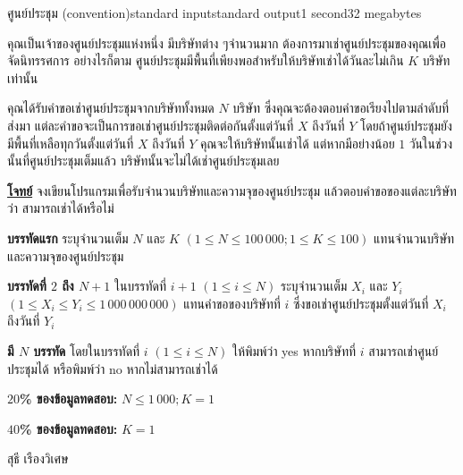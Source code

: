 \documentclass[11pt,a4paper]{article}
\begin{document}
\begin{problem}{ศูนย์ประชุม (convention)}{standard input}{standard output}{1 second}{32 megabytes}

คุณเป็นเจ้าของศูนย์ประชุมแห่งหนึ่ง มีบริษัทต่าง ๆจำนวนมาก ต้องการมาเช่าศูนย์ประชุมของคุณเพื่อจัดนิทรรศการ อย่างไรก็ตาม ศูนย์ประชุมมีพื้นที่เพียงพอสำหรับให้บริษัทเช่าได้วันละไม่เกิน $K$ บริษัทเท่านั้น

คุณได้รับคำขอเช่าศูนย์ประชุมจากบริษัททั้งหมด $N$ บริษัท ซึ่งคุณจะต้องตอบคำขอเรียงไปตามลำดับที่ส่งมา แต่ละคำขอจะเป็นการขอเช่าศูนย์ประชุมติดต่อกันตั้งแต่วันที่ $X$ ถึงวันที่ $Y$ โดยถ้าศูนย์ประชุมยังมีพื้นที่เหลือทุกวันตั้งแต่วันที่ $X$ ถึงวันที่ $Y$ คุณจะให้บริษัทนั้นเช่าได้ แต่หากมีอย่างน้อย $1$ วันในช่วงนั้นที่ศูนย์ประชุมเต็มแล้ว บริษัทนั้นจะไม่ได้เช่าศูนย์ประชุมเลย

\bigskip
\underline{\textbf{โจทย์}}  จงเขียนโปรแกรมเพื่อรับจำนวนบริษัทและความจุของศูนย์ประชุม แล้วตอบคำขอของแต่ละบริษัทว่า สามารถเช่าได้หรือไม่


\InputFile

\textbf{บรรทัดแรก} ระบุจำนวนเต็ม $N$ และ $K$ $(1 \leq N \leq 100\,000; 1 \leq K \leq 100)$ แทนจำนวนบริษัท และความจุของศูนย์ประชุม

\textbf{บรรทัดที่ $2$ ถึง $N+1$} ในบรรทัดที่ $i+1$ $(1 \leq i \leq N)$ ระบุจำนวนเต็ม $X_i$ และ $Y_i$ $(1 \leq X_i \leq Y_i \leq 1\,000\,000\,000)$ แทนคำขอของบริษัทที่ $i$ ซึ่งขอเช่าศูนย์ประชุมตั้งแต่วันที่ $X_i$ ถึงวันที่ $Y_i$

\OutputFile

\textbf{มี $N$ บรรทัด} โดยในบรรทัดที่ $i$ $(1 \leq i \leq N)$ ให้พิมพ์ว่า yes หากบริษัทที่ $i$ สามารถเช่าศูนย์ประชุมได้ หรือพิมพ์ว่า no หากไม่สามารถเช่าได้

\Examples

\begin{example}
%
%
\end{example}

\Scoring

\textbf{$20$\% ของข้อมูลทดสอบ:} $N \leq 1\,000; K = 1$

\textbf{$40$\% ของข้อมูลทดสอบ:} $K = 1$

\Source

สุธี เรืองวิเศษ 

\end{problem}
\end{document}
